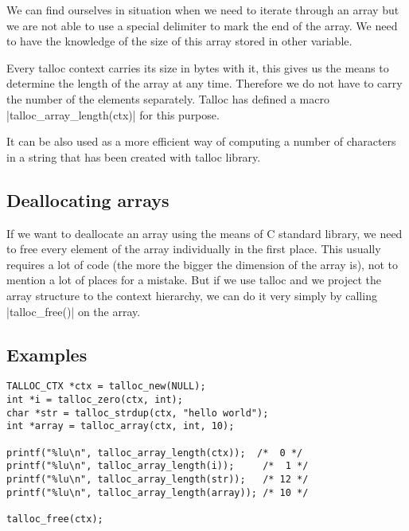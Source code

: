 We can find ourselves in situation when we need to iterate through an array but
we are not able to use a special delimiter to mark the end of the array. We need
to have the knowledge of the size of this array stored in other variable.

Every talloc context carries its size in bytes with it, this gives us the means
to determine the length of the array at any time. Therefore we do not have to
carry the number of the elements separately. Talloc has defined a macro
|talloc_array_length(ctx)| for this purpose.

It can be also used as a more efficient way of computing a number of characters
in a string that has been created with talloc library.

\subsection{Deallocating arrays}

If we want to deallocate an array using the means of C standard library, we need
to free every element of the array individually in the first place. This usually
requires a lot of code (the more the bigger the dimension of the array is), not
to mention a lot of places for a mistake. But if we use talloc and we project
the array structure to the context hierarchy, we can do it very simply by
calling |talloc_free()| on the array.

\subsection{Examples}

\begin{lstlisting}[caption={Length of an array},label=lst:array-length]
TALLOC_CTX *ctx = talloc_new(NULL);
int *i = talloc_zero(ctx, int);
char *str = talloc_strdup(ctx, "hello world");
int *array = talloc_array(ctx, int, 10);

printf("%lu\n", talloc_array_length(ctx));  /*  0 */
printf("%lu\n", talloc_array_length(i));     /*  1 */
printf("%lu\n", talloc_array_length(str));   /* 12 */
printf("%lu\n", talloc_array_length(array)); /* 10 */

talloc_free(ctx);
\end{lstlisting}